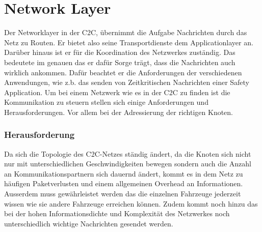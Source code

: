 \chapter{Network Layer\label{chap:networklayer}}
Der Networklayer in der \acl{C2C}, übernimmt die Aufgabe Nachrichten durch das Netz zu Routen. Er bietet also seine Transportdienste dem Applicationlayer an. Darüber hinaus ist er für die Koordination des Netzwerkes zuständig.
Das bedeutete im genauen das er dafür Sorge trägt, dass die Nachrichten auch wirklich ankommen. Dafür beachtet er die Anforderungen der verschiedenen Anwendungen, wie z.b. das senden von Zeitkritischen Nachrichten einer Safety Application. Um bei einem Netzwerk wie es in der \acl{C2C} zu finden ist die Kommunikation zu steuern stellen sich einige Anforderungen und Herausforderungen. Vor allem bei der Adressierung der richtigen Knoten.

\subsection{Herausforderung}
Da sich die Topologie des C2C-Netzes ständig ändert, da die Knoten sich nicht nur mit unterschiedlichen Geschwindigkeiten bewegen sondern auch die Anzahl an Kommunikationspartnern sich dauernd ändert, kommt es in dem Netz zu häufigen Paketverlusten und einem allgemeinen Overhead an Informationen. Ausserdem muss gewährleistet werden das die einzelnen Fahrzeuge jederzeit wissen wie sie andere Fahrzeuge erreichen können. Zudem kommt noch hinzu das bei der hohen Informationsdichte und Komplexität des Netzwerkes noch unterschiedlich wichtige Nachrichten gesendet werden.

